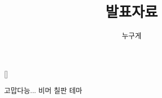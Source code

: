\usepackage[export]{adjustbox}
\usepackage{booktabs}

\usepackage{kotex}
[]
\setmonofont{Monaco}

\newcommand\independent{\protect\mathpalette{\protect\independenT}{\perp}}
\def\independenT#1#2{\mathrel{\rlap{$#1#2$}\mkern2mu{#1#2}}}
\usepackage{tikz}
\usetikzlibrary{positioning}
\usetikzlibrary{shapes,plotmarks,decorations.pathreplacing,automata}



\newcommand{\whitepic}[2]{
  \begin{center}
    \begin{tikzpicture}[scale=4, show background rectangle, background
      rectangle/.style={fill=white}]
      \node (label) at
      (0,0)[draw=black]{\texttt{[image: \#1]}};
    \end{tikzpicture}
  \end{center}
}

\newcommand{\rwhitepic}[2]{
\hfill   \begin{tikzpicture}[scale=4, show background rectangle, background
      rectangle/.style={fill=white}]
      \node (label) at
      (0,0)[draw=black]{\texttt{[image: \#1]}};
    \end{tikzpicture}
}


% 

\usepackage{tikz}\usetikzlibrary{arrows,positioning,shapes.geometric,calc,through,backgrounds}
\author{누구게}
\date{\vspace{-1em}}
\title{발표자료}


\maketitle






\begin{frame}{고맙다능...}
비머 칠판 테마
\vfill
%
\end{frame}



